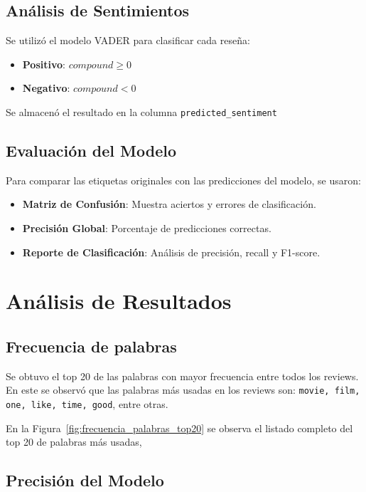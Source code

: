 \documentclass[conference]{IEEEtran}
\begin{document}
\subsection{Análisis de Sentimientos}

Se utilizó el modelo VADER para clasificar cada reseña:
\begin{itemize}
    \item \textbf{Positivo}: $compound \geq 0$
    \item \textbf{Negativo}: $compound < 0$
\end{itemize}

Se almacenó el resultado en la columna \texttt{predicted\_sentiment}


\subsection{Evaluación del Modelo}

Para comparar las etiquetas originales con las predicciones del modelo, se usaron:
\begin{itemize}
    \item \textbf{Matriz de Confusión}: Muestra aciertos y errores de clasificación.
    \item \textbf{Precisión Global}: Porcentaje de predicciones correctas.
    \item \textbf{Reporte de Clasificación}: Análisis de precisión, recall y F1-score.
\end{itemize}



\section{Análisis de Resultados}

\subsection{Frecuencia de palabras}

Se obtuvo el top 20 de las palabras con mayor frecuencia entre todos los reviews. En este se observó que las palabras más usadas en los reviews son: \texttt{movie, film, one, like, time, good}, entre otras. 

En la  Figura~\ref{fig:frecuencia_palabras_top20} se observa el listado completo del top 20 de palabras más usadas,


\subsection{Precisión del Modelo}
\end{document}
